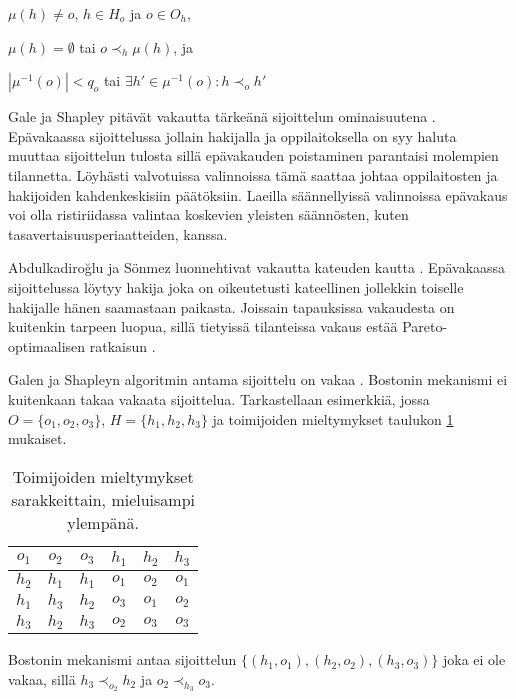 \documentclass[gradu, twoside]{tktltiki}
\begin{document}
\begin{itemize*}
  \item $\mu(h) \neq o$, $h \in H_o$ ja $o \in O_h$,
  \item $\mu(h) = \emptyset$ tai $o \prec_h \mu(h)$, ja
  \item $|\mu^{-1}(o)| < q_o$ tai $\exists h' \in \mu^{-1}(o): h
    \prec_o h'$
\end{itemize*}

Gale ja Shapley pitävät vakautta tärkeänä sijoittelun ominaisuutena
\cite{galeshapley62}. Epävakaassa sijoittelussa jollain hakijalla ja
oppilaitoksella on syy haluta muuttaa sijoittelun tulosta sillä
epävakauden poistaminen parantaisi molempien tilannetta. Löyhästi
valvotuissa valinnoissa tämä saattaa johtaa oppilaitosten ja
hakijoiden kahdenkeskisiin päätöksiin. Laeilla säännellyissä
valinnoissa epävakaus voi olla ristiriidassa valintaa koskevien
yleisten säännösten, kuten tasavertaisuusperiaatteiden, kanssa.

Abdulkadiroğlu ja Sönmez luonnehtivat vakautta kateuden kautta
\cite{abdusön03}. Epävakaassa sijoittelussa löytyy hakija joka on
oikeutetusti kateellinen jollekkin toiselle hakijalle hänen saamastaan
paikasta. Joissain tapauksissa vakaudesta on kuitenkin tarpeen luopua,
sillä tietyissä tilanteissa vakaus estää Pareto-optimaalisen ratkaisun
\cite{ergin02}.

Galen ja Shapleyn algoritmin antama sijoittelu on vakaa
\cite{galeshapley62, gusfield89}. Bostonin mekanismi ei kuitenkaan
takaa vakaata sijoittelua. Tarkastellaan esimerkkiä, jossa $O = \{o_1,
o_2, o_3\}$, $H = \{h_1, h_2, h_3\}$ ja toimijoiden mieltymykset
taulukon \ref{boston_vakaus} mukaiset.

\begin{table}[ht]
  \begin{center}
    \begin{tabular}{ c c c | c c c }
    $o_1$ & $o_2$ & $o_3$ & $h_1$ & $h_2$ & $h_3$ \\
    \hline
    $h_2$ & $h_1$ & $h_1$ & $o_1$ & $o_2$ & $o_1$ \\
    $h_1$ & $h_3$ & $h_2$ & $o_3$ & $o_1$ & $o_2$ \\
    $h_3$ & $h_2$ & $h_3$ & $o_2$ & $o_3$ & $o_3$
    \end{tabular}
    \caption{Toimijoiden mieltymykset sarakkeittain, mieluisampi ylempänä.}
    \label{boston_vakaus}
  \end{center}
\end{table}

Bostonin mekanismi antaa sijoittelun $\{(h_1, o_1), (h_2, o_2), (h_3,
o_3)\}$ joka ei ole vakaa, sillä $h_3 \prec_{o_2} h_2$ ja $o_2
\prec_{h_3} o_3$.
\end{document}

